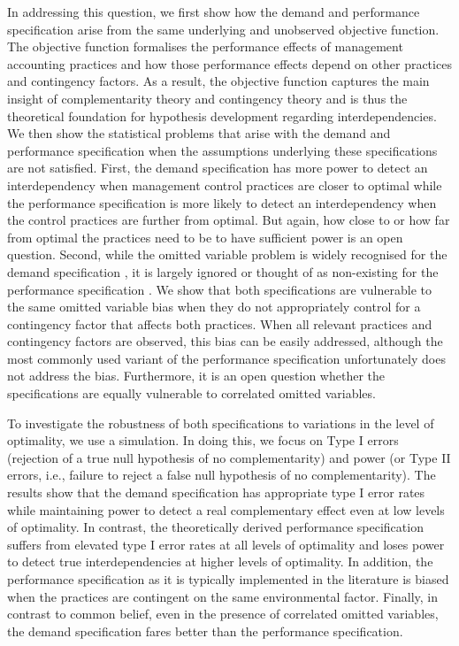 \documentclass[12pt]{article}
\begin{document}
In addressing this question, we first show how the demand and performance specification arise from the same underlying and unobserved objective function. The objective function formalises the performance effects of management accounting practices and how those performance effects depend on other practices and contingency factors. As a result, the objective function captures the main insight of complementarity theory \citep{milgrom_complementarities_1995,grabner_management_2013} and contingency theory \citep{chenhall_management_2003,otley_contingency_2016} and is thus the theoretical foundation for hypothesis development regarding interdependencies. We then show the statistical problems that arise with the demand and performance specification when the assumptions underlying these specifications are not satisfied. First, the demand specification has more power to detect an interdependency when management control practices are closer to optimal while the performance specification is more likely to detect an interdependency when the control practices are further from optimal. But again, how close to or how far from optimal the practices need to be to have sufficient power is an open question. Second, while the omitted variable problem is widely recognised for the demand specification \citep{grabner_management_2013, arora_testing_1996, hofmann_organizational_2017}, it is largely ignored \citep{grabner_management_2013, hofmann_organizational_2017} or thought of as non-existing for the performance specification \citep{carree_note_2011}. We show that both specifications are vulnerable to the same omitted variable bias when they do not appropriately control for a contingency factor that affects both practices. When all relevant practices and contingency factors are observed, this bias can be easily addressed, although the most commonly used variant of the performance specification unfortunately does not address the bias. Furthermore, it is an open question whether the specifications are equally vulnerable to correlated omitted variables.

To investigate the robustness of both specifications to variations in the level of optimality, we use a simulation. In doing this, we focus on Type I errors (rejection of a true null hypothesis of no complementarity) and power (or Type II errors, i.e., failure to reject a false null hypothesis of no complementarity). The results show that the demand specification has appropriate type I error rates while maintaining power to detect a real complementary effect even at low levels of optimality. In contrast, the theoretically derived performance specification suffers from elevated type I error rates at all levels of optimality and loses power to detect true interdependencies at higher levels of optimality. In addition, the performance specification as it is typically implemented in the literature is biased when the practices are contingent on the same environmental factor. Finally, in contrast to common belief, even in the presence of correlated omitted variables, the demand specification fares better than the performance specification.
\end{document}
